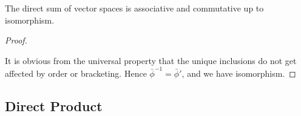 \begin{theorem}
    The direct sum of vector spaces is associative and commutative up to isomorphism.
\end{theorem}
\begin{proof}
    \begin{center}
    \end{center}
    It is obvious from the universal property that
    the unique inclusions do not get affected by order or bracketing.
    Hence \(\bar{\phi}^{-1} = \bar{\phi}'\),
    and we have isomorphism.
\end{proof}


\subsection{Direct Product}

